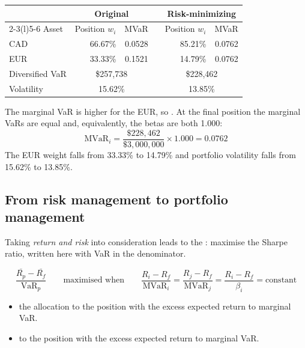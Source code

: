 \begin{imexbox}[title={Calculating the risk-minimizing position}]
\begin{center}\small
\begin{tabular}{@{}lrrcrr@{}}
\toprule
& \multicolumn{2}{c}{\textbf{Original}} & & \multicolumn{2}{c}{\textbf{Risk-minimizing}} \\
\cmidrule(r){2-3}\cmidrule(l){5-6}
Asset & Position $w_i$ & MVaR & & Position $w_i$ & MVaR \\
\midrule
CAD & 66.67\% & 0.0528 & & 85.21\% & 0.0762 \\
EUR & 33.33\% & 0.1521 & & 14.79\% & 0.0762 \\
\midrule
Diversified VaR & \multicolumn{2}{c}{\$257,738} & & \multicolumn{2}{c}{\$228,462} \\
Volatility & \multicolumn{2}{c}{15.62\%} & & \multicolumn{2}{c}{13.85\%} \\
\bottomrule
\end{tabular}
\end{center}
\medskip
The marginal VaR is higher for the EUR, so . At the final position the marginal VaRs are equal and,
equivalently, the betas are both 1.000:
\[ \text{MVaR}_i = \frac{\$228{,}462}{\$3{,}000{,}000} \times 1.000 = 0.0762 \]
The EUR weight falls from 33.33\% to 14.79\% and portfolio volatility falls from
15.62\% to 13.85\%.
\end{imexbox}

\subsection{From risk management to portfolio management}

Taking \emph{return and risk} into consideration leads to the : maximise the Sharpe ratio, written here with VaR in the denominator.

\begin{imfmlbox}
\[ \frac{\overline{R_p} - \overline{R_f}}{\text{VaR}_p}
   \qquad\text{maximised when}\qquad
   \frac{R_i - R_f}{\text{MVaR}_i} = \frac{R_j - R_f}{\text{MVaR}_j}
   = \frac{R_i - R_f}{\beta_i} = \text{constant} \]
\end{imfmlbox}

\begin{itemize}
\item {} the allocation to the position with the  excess
expected return to marginal VaR.
\item {} to the position with the  excess expected return to
marginal VaR.
\end{itemize}

